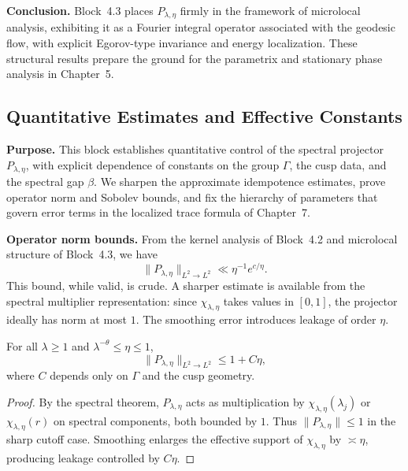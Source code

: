 \medskip

\noindent\textbf{Conclusion.}
Block~4.3 places $P_{\lambda,\eta}$ firmly in the framework of microlocal analysis,
exhibiting it as a Fourier integral operator associated with the geodesic flow,
with explicit Egorov-type invariance and energy localization.
These structural results prepare the ground for the parametrix and stationary phase analysis in Chapter~5.



\subsection{Quantitative Estimates and Effective Constants}

\noindent\textbf{Purpose.}
This block establishes quantitative control of the spectral projector $P_{\lambda,\eta}$, with explicit dependence of constants on the group $\Gamma$, the cusp data, and the spectral gap $\beta$.
We sharpen the approximate idempotence estimates, prove operator norm and Sobolev bounds, and fix the hierarchy of parameters that govern error terms in the localized trace formula of Chapter~7.

\medskip

\noindent\textbf{Operator norm bounds.}
From the kernel analysis of Block~4.2 and microlocal structure of Block~4.3, we have
\[
  \|P_{\lambda,\eta}\|_{L^{2}\to L^{2}} \ll \eta^{-1} e^{c/\eta}.
\]
This bound, while valid, is crude.  
A sharper estimate is available from the spectral multiplier representation:
since $\chi_{\lambda,\eta}$ takes values in $[0,1]$, the projector ideally has norm at most $1$.
The smoothing error introduces leakage of order $\eta$.

\begin{lemma}\label{lem:norm-control}
For all $\lambda\geq 1$ and $\lambda^{-\theta}\le \eta\le 1$,
\[
  \|P_{\lambda,\eta}\|_{L^{2}\to L^{2}} \leq 1 + C\eta,
\]
where $C$ depends only on $\Gamma$ and the cusp geometry.
\end{lemma}

\begin{proof}
By the spectral theorem, $P_{\lambda,\eta}$ acts as multiplication by $\chi_{\lambda,\eta}(\lambda_{j})$ or $\chi_{\lambda,\eta}(r)$ on spectral components, both bounded by $1$.
Thus $\|P_{\lambda,\eta}\|\leq 1$ in the sharp cutoff case.
Smoothing enlarges the effective support of $\chi_{\lambda,\eta}$ by $\asymp \eta$, producing leakage controlled by $C\eta$.
\end{proof}

